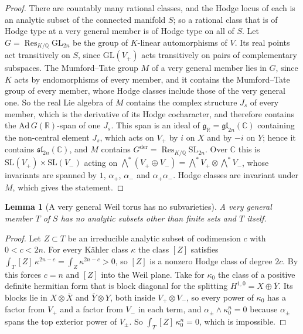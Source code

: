 \documentclass[11pt,reqno]{amsart}
\theoremstyle{plain}
\newtheorem{lemma}[theorem]{Lemma}
\theoremstyle{definition}
\theoremstyle{remark}
\newcommand{\QQ}{\mathbb{Q}}
\newcommand{\RR}{\mathbb{R}}
\newcommand{\CC}{\mathbb{C}}
\DeclareMathOperator{\Res}{Res}
\newcommand{\bbar}[1]{\overline{#1}}
\begin{document}
\begin{proof}
There are countably many rational classes, and the Hodge locus of each is an
analytic subset of the connected manifold $S$; so a rational class that is of
Hodge type at a very general member is of Hodge type on all of $S$.
Let $G=\Res_{K/\QQ}\mathrm{GL}_{2n}$ be the group of $K$-linear automorphisms
of $V$. Its real points act transitively on $S$, since
$\mathrm{GL}(V_{+})$ acts transitively on pairs of complementary subspaces.
The Mumford--Tate group $M$ of a very general member lies in $G$, since $K$
acts by endomorphisms of every member, and it contains the Mumford--Tate group
of every member, whose Hodge classes include those of the very general one.
So the real Lie algebra of $M$ contains the complex structure $J_{s}$ of every
member, which is the derivative of its Hodge cocharacter, and therefore
contains the $\mathrm{Ad}\,G(\RR)$-span of one $J_{s}$. This span is an ideal of
$\mathfrak{g}_{\RR}=\mathfrak{gl}_{2n}(\CC)$ containing the non-central
element $J_{s}$, which acts on $V_{+}$ by $i$ on $X$ and by $-i$ on $Y$; hence
it contains $\mathfrak{sl}_{2n}(\CC)$, and $M$ contains
$G^{\mathrm{der}}=\Res_{K/\QQ}\mathrm{SL}_{2n}$. Over $\CC$ this is
$\mathrm{SL}(V_{+})\times\mathrm{SL}(V_{-})$ acting on
$\bigwedge^{*}(V_{+}\oplus V_{-})=\bigwedge^{*}V_{+}\otimes\bigwedge^{*}V_{-}$,
whose invariants are spanned by $1$, $\alpha_{+}$, $\alpha_{-}$ and
$\alpha_{+}\alpha_{-}$. Hodge classes are invariant under $M$, which gives
the statement.
\end{proof}

\begin{lemma}[A very general Weil torus has no subvarieties]
\label{lem:weiltorussubsets}
A very general member $T$ of $S$ has no analytic subsets other than finite
sets and $T$ itself.
\end{lemma}

\begin{proof}
Let $Z\subset T$ be an irreducible analytic subset of codimension $c$ with
$0<c<2n$. For every K\"ahler class $\kappa$ the class $[Z]$ satisfies
$\int_{T}[Z]\,\kappa^{2n-c}=\int_{Z}\kappa^{2n-c}>0$, so $[Z]$ is a nonzero
Hodge class of degree $2c$. By  this forces $c=n$ and
$[Z]$ into the Weil plane. Take for $\kappa_{0}$ the class of a positive
definite hermitian form that is block diagonal for the splitting
$H^{1,0}=X\oplus\bbar{Y}$. Its blocks lie in $X\otimes\bbar{X}$ and
$\bbar{Y}\otimes Y$, both inside $V_{+}\otimes V_{-}$, so every power of
$\kappa_{0}$ has a factor from $V_{+}$ and a factor from $V_{-}$ in each term,
and $\alpha_{\pm}\wedge\kappa_{0}^{n}=0$ because $\alpha_{\pm}$ spans the top
exterior power of $V_{\pm}$. So
$\int_{T}[Z]\,\kappa_{0}^{n}=0$, which is impossible.
\end{proof}
\end{document}
